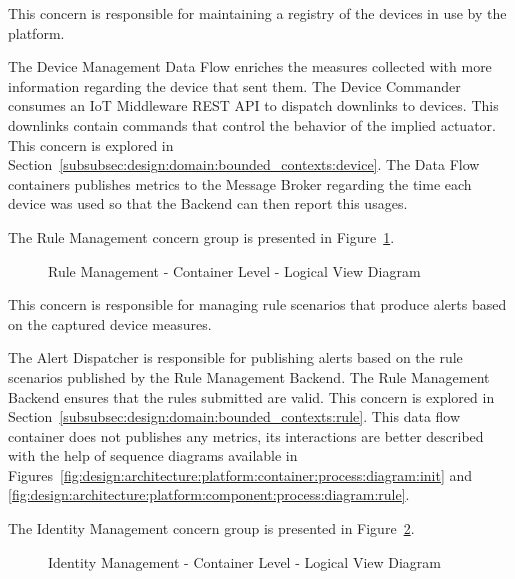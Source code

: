 This concern is responsible for maintaining a registry of the devices in use by the platform.

The Device Management Data Flow enriches the measures collected with more information regarding the device that sent them. The Device Commander consumes an \gls{IoT} Middleware REST \gls{API} to dispatch downlinks to devices. This downlinks contain commands that control the behavior of the implied actuator.
This concern is explored in Section~\ref{subsubsec:design:domain:bounded_contexts:device}. The Data Flow containers publishes metrics to the Message Broker regarding the time each device was used so that the Backend can then report this usages.

The Rule Management concern group is presented in Figure~\ref{fig:design:architecture:platform:containers:logical:rule}.

\begin{figure}[H]
   \centering
   \resizebox{\columnwidth}{!}
       {
       
       }
   \caption[Rule Management - Container Level - Logical View Diagram]{Rule Management - Container Level - Logical View Diagram}
   \label{fig:design:architecture:platform:containers:logical:rule}
\end{figure}

This concern is responsible for managing rule scenarios that produce alerts based on the captured device measures.

The Alert Dispatcher is responsible for publishing alerts based on the rule scenarios published by the Rule Management Backend. The Rule Management Backend ensures that the rules submitted are valid. This concern is explored in Section~\ref{subsubsec:design:domain:bounded_contexts:rule}. This data flow container does not publishes any metrics, its interactions are better described with the help of sequence diagrams available in Figures~\ref{fig:design:architecture:platform:container:process:diagram:init} and \ref{fig:design:architecture:platform:component:process:diagram:rule}.

The Identity Management concern group is presented in Figure~\ref{fig:design:architecture:platform:containers:logical:identity}.

\begin{figure}[H]
   \centering
   \resizebox{\columnwidth}{!}
       {
       
       }
   \caption[Identity Management - Container Level - Logical View Diagram]{Identity Management - Container Level - Logical View Diagram}
   \label{fig:design:architecture:platform:containers:logical:identity}
\end{figure}

